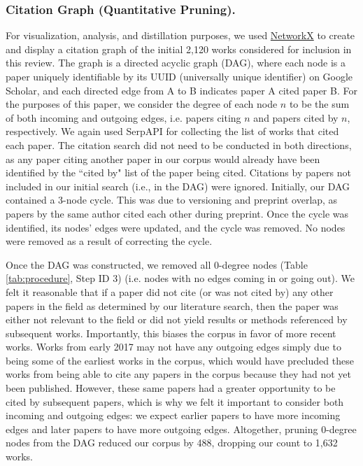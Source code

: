 \documentclass[manuscript,screen,review]{acmart}
\begin{document}
\subsubsection{Citation Graph (Quantitative Pruning).}\label{subsubsec:quantitative_pruning}

For visualization, analysis, and distillation purposes, we used \href{https://networkx.org/}{NetworkX} to create and display a citation graph of the initial 2,120 works considered for inclusion in this review. The graph is a directed acyclic graph (DAG), where each node is a paper uniquely identifiable by its UUID (universally unique identifier) on Google Scholar, and each directed edge from A to B indicates paper A cited paper B. For the purposes of this paper, we consider the degree of each node $n$ to be the sum of both incoming and outgoing edges, i.e. papers citing $n$ and papers cited by $n$, respectively. We again used SerpAPI for collecting the list of works that cited each paper. The citation search did not need to be conducted in both directions, as any paper citing another paper in our corpus would already have been identified by the ``cited by" list of the paper being cited. Citations by papers not included in our initial search (i.e., in the DAG) were ignored. Initially, our DAG contained a 3-node cycle. This was due to versioning and preprint overlap, as papers by the same author cited each other during preprint. Once the cycle was identified, its nodes' edges were updated, and the cycle was removed. No nodes were removed as a result of correcting the cycle.

Once the DAG was constructed, we removed all 0-degree nodes (Table \ref{tab:procedure}, Step ID 3) (i.e. nodes with no edges coming in or going out). We felt it reasonable that if a paper did not cite (or was not cited by) any other papers in the field as determined by our literature search, then the paper was either not relevant to the field or did not yield results or methods referenced by subsequent works. Importantly, this biases the corpus in favor of more recent works. Works from early 2017 may not have any outgoing edges simply due to being some of the earliest works in the corpus, which would have precluded these works from being able to cite any papers in the corpus because they had not yet been published. However, these same papers had a greater opportunity to be cited by subsequent papers, which is why we felt it important to consider both incoming and outgoing edges: we expect earlier papers to have more incoming edges and later papers to have more outgoing edges. Altogether, pruning 0-degree nodes from the DAG reduced our corpus by 488, dropping our count to 1,632 works.
\end{document}
